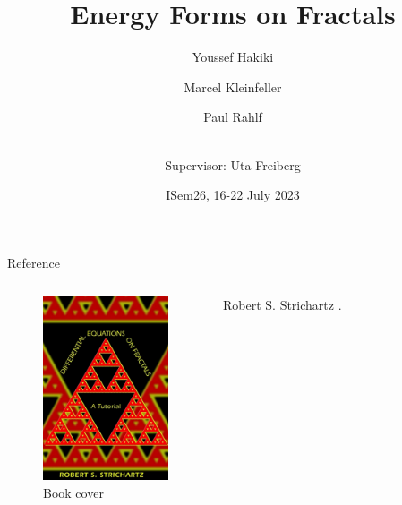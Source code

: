 \documentclass[notheorems]{beamer}
\title{Energy Forms on Fractals}
\author %
{Youssef Hakiki\inst{1} \and Marcel Kleinfeller\inst{2} \and Paul Rahlf\inst{3} \and \\[3mm] {\small Supervisor: Uta Freiberg\inst{4}}}
\institute[VFU] %
{
  \inst{1}%
  Cadi Ayyad University
  \and
  \inst{2}%
  Technical University of Darmstadt
  \and
  \inst{3}%
  Kiel University
  \and
  \inst{4}%
  Chemnitz University of Technology
}
\date %
{ISem26, 16-22 July 2023}
\theoremstyle{definition}
\theoremstyle{plain}
\theoremstyle{remark}
\newcommand{\1}{\mathds{1}} %
\begin{document}
\begin{frame}
    \titlepage
\end{frame}


\begin{frame}{Reference}
  \begin{columns}[c]
    \begin{figure}
        \centering
        \includegraphics[width=10em]{images/book.pdf}
        \caption{Book cover}
    \end{figure}
    \begin{thebibliography}{10}
      \alert{Robert S. Strichartz}
      .
    \end{thebibliography}
\end{columns}
\end{frame}




\end{document}
